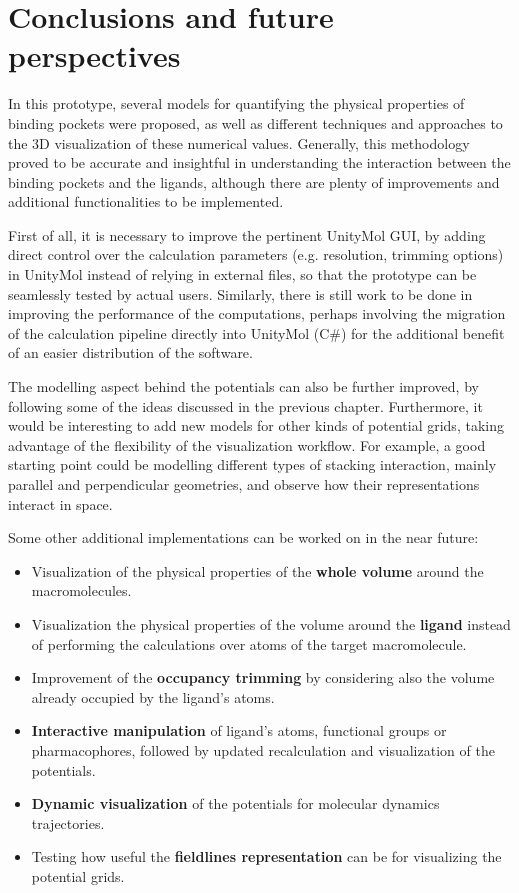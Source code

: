 \chapter{Conclusions and future perspectives} %
In this prototype, several models for quantifying the physical properties of binding pockets were proposed, as well as different techniques and approaches to the 3D visualization of these numerical values. Generally, this methodology proved to be accurate and insightful in understanding the interaction between the binding pockets and the ligands, although there are plenty of improvements and additional functionalities to be implemented.

First of all, it is necessary to improve the pertinent UnityMol GUI, by adding direct control over the calculation parameters (e.g. resolution, trimming options) in UnityMol instead of relying in external files, so that the prototype can be seamlessly tested by actual users. Similarly, there is still work to be done in improving the performance of the computations, perhaps involving the migration of the calculation pipeline directly into UnityMol (C\#) for the additional benefit of an easier distribution of the software.

The modelling aspect behind the potentials can also be further improved, by following some of the ideas discussed in the previous chapter. Furthermore, it would be interesting to add new models for other kinds of potential grids, taking advantage of the flexibility of the visualization workflow. For example, a good starting point could be modelling different types of stacking interaction, mainly parallel and perpendicular geometries, and observe how their representations interact in space.

Some other additional implementations can be worked on in the near future:
\begin{itemize}
  \item Visualization of the physical properties of the \textbf{whole volume} around the macromolecules.
  \item Visualization the physical properties of the volume around the \textbf{ligand} instead of performing the calculations over atoms of the target macromolecule.
  \item Improvement of the \textbf{occupancy trimming} by considering also the volume already occupied by the ligand's atoms.
  \item \textbf{Interactive manipulation} of ligand's atoms, functional groups or pharmacophores, followed by updated recalculation and visualization of the potentials.
  \item \textbf{Dynamic visualization} of the potentials for molecular dynamics trajectories.
  \item Testing how useful the \textbf{fieldlines representation} can be for visualizing the potential grids.
\end{itemize}
